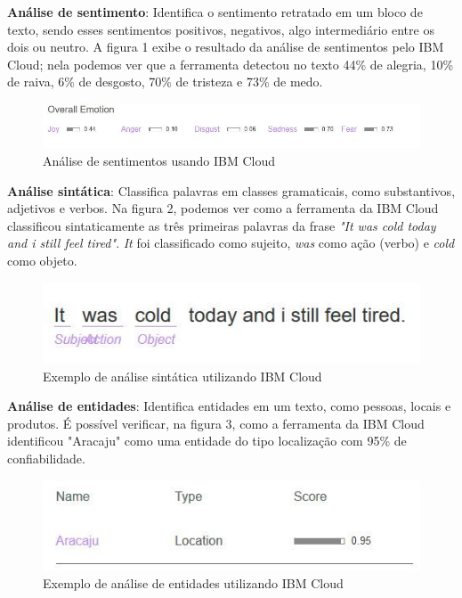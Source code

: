 \documentclass{article}
\begin{document}
\textbf{Análise de sentimento}: Identifica o sentimento retratado em um bloco de texto, sendo esses sentimentos positivos, negativos, algo intermediário entre os dois ou neutro. A figura 1 exibe o resultado da análise de sentimentos pelo IBM Cloud; nela podemos ver que a ferramenta detectou no texto 44\% de alegria, 10\% de raiva, 6\% de desgosto, 70\% de tristeza e 73\% de medo. \\
\begin{figure}[H]
    \centering
    \includegraphics[scale=0.5]{imagens/nlp_sentimentos.jpg}
    \caption{Análise de sentimentos usando IBM Cloud}
    \label{fig:my_label}
\end{figure}{}
\textbf{Análise sintática}: Classifica palavras em classes gramaticais, como substantivos, adjetivos e verbos. Na figura 2, podemos ver como a ferramenta da IBM Cloud classificou sintaticamente as três primeiras palavras da frase \textit{"It was cold today and i still feel tired"}. \textit{It} foi classificado como sujeito, \textit{was} como ação (verbo) e \textit{cold} como objeto. \\
\begin{figure}[H]
    \centering
    \includegraphics[scale=0.5]{imagens/nlp_analise_sintatica.jpg}
    \caption{Exemplo de análise sintática utilizando IBM Cloud}
    \label{fig:sintatica}
\end{figure}{}
\textbf{Análise de entidades}: Identifica entidades em um texto, como pessoas, locais e produtos. É possível verificar, na figura 3, como a ferramenta da IBM Cloud identificou "Aracaju" como uma entidade do tipo localização com 95\% de confiabilidade. \\
\begin{figure}[H]
    \centering
    \includegraphics[scale=0.5]{imagens/nlp_entidade.jpg}
    \caption{Exemplo de análise de entidades utilizando IBM Cloud}
    \label{fig:nlp_entidades}
\end{figure}{}
\end{document}

